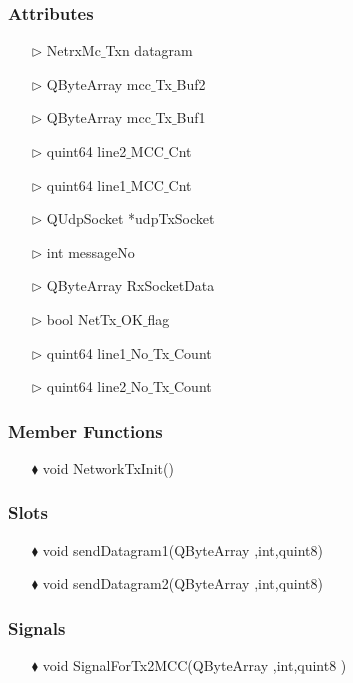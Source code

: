 \begin{enumerate}
\subsubsection{Attributes}
\begin{enumerate}
	\item [$\rhd$] NetrxMc$\_$Txn datagram
	\item [$\rhd$] QByteArray mcc$\_$Tx$\_$Buf2
	\item [$\rhd$] QByteArray mcc$\_$Tx$\_$Buf1
	\item [$\rhd$] quint64 line2$\_$MCC$\_$Cnt
	\item [$\rhd$] quint64 line1$\_$MCC$\_$Cnt	
	\item [$\rhd$] QUdpSocket *udpTxSocket
	\item [$\rhd$] int messageNo
	\item [$\rhd$] QByteArray RxSocketData
	\item [$\rhd$] bool NetTx$\_$OK$\_$flag
	\item [$\rhd$] quint64 line1$\_$No$\_$Tx$\_$Count
	\item [$\rhd$] quint64 line2$\_$No$\_$Tx$\_$Count	
\end{enumerate}

\subsubsection{Member Functions }
\begin{enumerate}
	\item [$\blacklozenge$] void NetworkTxInit()
\end{enumerate}


\subsubsection{Slots}
\begin{enumerate}
	\item [$\blacklozenge$] void sendDatagram1(QByteArray ,int,quint8)
	\item [$\blacklozenge$] void sendDatagram2(QByteArray ,int,quint8)
\end{enumerate}

\subsubsection{Signals}
\begin{enumerate}
	\item [$\blacklozenge$] void SignalForTx2MCC(QByteArray ,int,quint8 )
\end{enumerate}


\end{enumerate}
